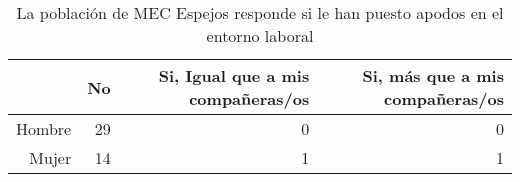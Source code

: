 \begin{table}[ht]
\centering
\begin{tabular}{rrrr}
  \hline
 & No & Si, Igual que a mis compañeras/os & Si, más que a mis compañeras/os \\ 
  \hline
Hombre &  29 &   0 &   0 \\ 
  Mujer &  14 &   1 &   1 \\ 
   \hline
\end{tabular}
\caption{La población de MEC Espejos responde
             si le han puesto apodos en el entorno laboral} 
\end{table}

